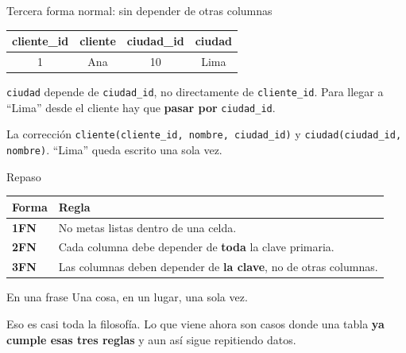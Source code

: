 \documentclass[aspectratio=169,10pt,c]{beamer}
\newcommand{\fn}[1]{\tikz[baseline=-0.5ex]{\node[rounded corners=2pt,fill=utpRojo,text=white,
  font=\bfseries\small,inner xsep=6pt,inner ysep=3pt] {#1};}}
\newcommand{\tbl}[1]{\textcolor{utpNaranja}{\texttt{#1}}}
\begin{document}
\begin{frame}{\fn{3FN} Tercera forma normal: sin depender de otras columnas}
\begin{center}
\footnotesize\setlength\tabcolsep{7pt}
\begin{tabular}{cccc}
\toprule
\bfseries cliente\_id & \bfseries cliente & \bfseries ciudad\_id & \bfseries ciudad \\
\midrule
1 & Ana & 10 & Lima \\
\bottomrule
\end{tabular}
\end{center}
\vspace{0.2cm}
\small \texttt{ciudad} depende de \texttt{ciudad\_id}, no directamente de \texttt{cliente\_id}. Para llegar a ``Lima'' desde el cliente hay que \textbf{pasar por} \texttt{ciudad\_id}.
\vspace{0.15cm}
\begin{exampleblock}{La corrección}
\small \tbl{cliente}\texttt{(cliente\_id, nombre, ciudad\_id)} y \tbl{ciudad}\texttt{(ciudad\_id, nombre)}. ``Lima'' queda escrito una sola vez.
\end{exampleblock}
\end{frame}

\begin{frame}{Repaso}
\begin{center}
\footnotesize{}
\begin{tabular}{>{\bfseries}p{1.4cm}>{\raggedright\arraybackslash}p{10.5cm}}
\toprule
Forma & Regla \\
\midrule
1FN & No metas listas dentro de una celda. \\[4pt]
2FN & Cada columna debe depender de \textbf{toda} la clave primaria. \\[4pt]
3FN & Las columnas deben depender de \textbf{la clave}, no de otras columnas. \\
\bottomrule
\end{tabular}
\end{center}
\vspace{0.35cm}
\begin{block}{En una frase}
\centering\large Una cosa, en un lugar, una sola vez.
\end{block}
\vspace{0.2cm}
\small Eso es casi toda la filosofía. Lo que viene ahora son casos donde una tabla \textbf{ya cumple esas tres reglas} y aun así sigue repitiendo datos.
\end{frame}
\end{document}
